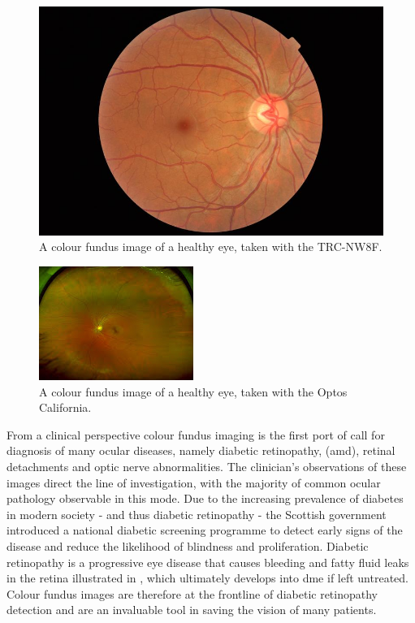 \begin{figure}[H]
\centering
\includegraphics{figures/colourtrc}
\caption{A colour fundus image of a healthy eye, taken with the TRC-NW8F.\cite{1_topconmedical.com_2015}}
\label{fig:cf}
   \end{figure}

\begin{figure}[H]
\centering
\includegraphics{figures/optoscolour}
\caption{A colour fundus image of a healthy eye, taken with the Optos California.\cite{1_optos.com_2015}}
\label{fig:cfoptos}
   \end{figure}


From a clinical perspective colour fundus imaging is the first port of call
for diagnosis of many ocular diseases, namely diabetic retinopathy, (\gls{amd}), retinal detachments and optic nerve abnormalities.\cite{3_medicine.uiowa.edu_2015} The clinician's
observations of these images direct the line of investigation, with the
majority of common ocular pathology observable in this mode. Due to
the increasing prevalence of diabetes in modern society - and thus
diabetic retinopathy - the Scottish government introduced a national diabetic screening programme to detect early signs of the disease and reduce the
likelihood of blindness and proliferation. Diabetic retinopathy is a progressive
eye disease that causes bleeding and fatty fluid leaks in the retina illustrated
in , which ultimately develops into \gls{dme} if
left untreated. Colour fundus images are therefore at the frontline of
diabetic retinopathy detection and are an invaluable tool in saving the vision
of many patients.


